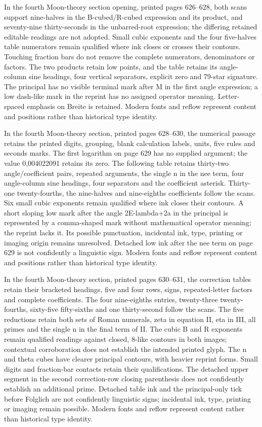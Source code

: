 In the fourth Moon-theory section opening, printed pages 626--628, both scans support nine-halves in the B-cubed/R-cubed expression and its product, and seventy-nine thirty-seconds in the unbarred-root expression; the differing retained editable readings are not adopted. Small cubic exponents and the four five-halves table numerators remain qualified where ink closes or crosses their contours. Touching fraction bars do not remove the complete numerators, denominators or factors. The two products retain low points, and the table retains its angle-column sine headings, four vertical separators, explicit zero and 79-star signature. The principal has no visible terminal mark after M in the first angle expression; a low dash-like mark in the reprint has no assigned operator meaning. Letter-spaced emphasis on Breite is retained. Modern fonts and reflow represent content and positions rather than historical type identity.

In the fourth Moon-theory section, printed pages 628--630, the numerical passage retains the printed digits, grouping, blank calculation labels, units, five rules and seconds marks. The first logarithm on page 629 has no supplied argument; the value 0,004022091 retains its zero. The following table retains thirty-two angle/coefficient pairs, repeated arguments, the single n in the nee term, four angle-column sine headings, four separators and the coefficient asterisk. Thirty-one twenty-fourths, the nine-halves and nine-eighths coefficients follow the scans. Six small cubic exponents remain qualified where ink closes their contours. A short sloping low mark after the angle 2E-lambda+2a in the principal is represented by a comma-shaped mark without mathematical operator meaning; the reprint lacks it. Its possible punctuation, incidental ink, type, printing or imaging origin remains unresolved. Detached low ink after the nee term on page 629 is not confidently a linguistic sign. Modern fonts and reflow represent content and positions rather than historical type identity.

In the fourth Moon-theory section, printed pages 630--631, the correction tables retain their bracketed headings, five and four rows, signs, repeated-letter factors and complete coefficients. The four nine-eighths entries, twenty-three twenty-fourths, sixty-five fifty-sixths and one thirty-second follow the scans. The five reductions retain both sets of Roman numerals, zeta in equation II, eta in III, all primes and the single n in the final term of II. The cubic B and R exponents remain qualified readings against closed, 8-like contours in both images; contextual corroboration does not establish the intended printed glyph. The n and theta cubes have clearer principal contours, with heavier reprint forms. Small digits and fraction-bar contacts retain their qualifications. The detached upper segment in the second correction-row closing parenthesis does not confidently establish an additional prime. Detached table ink and the principal-only tick before Folglich are not confidently linguistic signs; incidental ink, type, printing or imaging remain possible. Modern fonts and reflow represent content rather than historical type identity.

